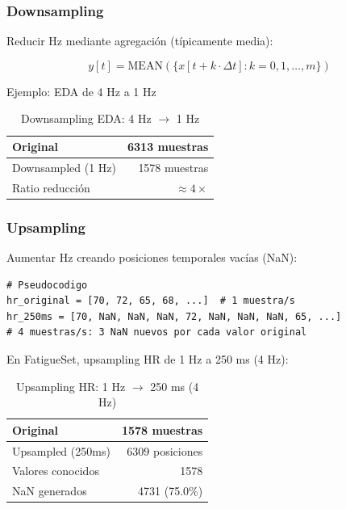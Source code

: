 \documentclass[11pt,twoside,a4paper]{article}
\begin{document}
\subsubsection{Downsampling}

Reducir Hz mediante agregación (típicamente media):

\begin{equation}
y[t] = \text{MEAN}(\{x[t + k \cdot \Delta t] : k = 0, 1, \ldots, m\})
\end{equation}

Ejemplo: EDA de 4 Hz a 1 Hz

\begin{table}[H]
\centering
\caption{Downsampling EDA: 4 Hz $\to$ 1 Hz}
\label{tab:downsample}
\begin{tabular}{|l|r|}
\hline
Original & 6313 muestras \\
\hline
Downsampled (1 Hz) & 1578 muestras \\
\hline
Ratio reducción & $\approx 4\times$ \\
\hline
\end{tabular}
\end{table}

\subsubsection{Upsampling}

Aumentar Hz creando posiciones temporales vacías (NaN):

\begin{lstlisting}
# Pseudocodigo
hr_original = [70, 72, 65, 68, ...]  # 1 muestra/s
hr_250ms = [70, NaN, NaN, NaN, 72, NaN, NaN, NaN, 65, ...]
# 4 muestras/s: 3 NaN nuevos por cada valor original
\end{lstlisting}

En FatigueSet, upsampling HR de 1 Hz a 250 ms (4 Hz):

\begin{table}[H]
\centering
\caption{Upsampling HR: 1 Hz $\to$ 250 ms (4 Hz)}
\label{tab:upsample}
\begin{tabular}{|l|r|}
\hline
Original & 1578 muestras \\
\hline
Upsampled (250ms) & 6309 posiciones \\
\hline
Valores conocidos & 1578 \\
\hline
NaN generados & 4731 (75.0\%) \\
\hline
\end{tabular}
\end{table}
\end{document}
